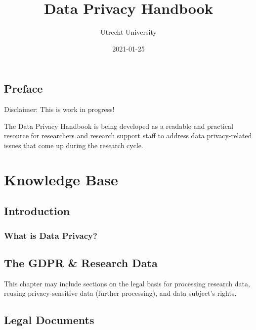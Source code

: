 \documentclass[
]{book}
\title{Data Privacy Handbook}
\author{Utrecht University}
\date{2021-01-25}
\begin{document}
\maketitle

{
\setcounter{tocdepth}{1}
\tableofcontents
}
\hypertarget{preface}{%
\chapter*{Preface}\label{preface}}

Disclaimer: This is work in progress!

The Data Privacy Handbook is being developed as a readable and practical resource for researchers and research support staff to address data privacy-related issues that come up during the research cycle.

\hypertarget{part-knowledge-base}{%
\part{Knowledge Base}\label{part-knowledge-base}}

\hypertarget{introduction}{%
\chapter*{Introduction}\label{introduction}}

\hypertarget{what-is-data-privacy}{%
\section{What is Data Privacy?}\label{what-is-data-privacy}}

\hypertarget{the-gdpr-research-data}{%
\chapter*{The GDPR \& Research Data}\label{the-gdpr-research-data}}

This chapter may include sections on the legal basis for processing research data, reusing privacy-sensitive data (further processing), and data subject's rights.

\hypertarget{legal-documents}{%
\chapter*{Legal Documents}\label{legal-documents}}
\end{document}
